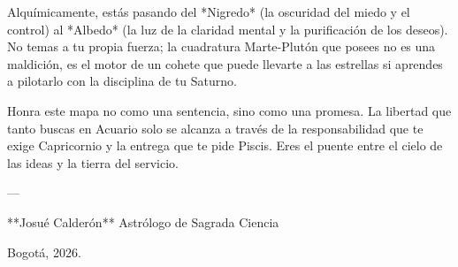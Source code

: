 Alquímicamente, estás pasando del *Nigredo* (la oscuridad del miedo y el control) al *Albedo* (la luz de la claridad mental y la purificación de los deseos). No temas a tu propia fuerza; la cuadratura Marte-Plutón que posees no es una maldición, es el motor de un cohete que puede llevarte a las estrellas si aprendes a pilotarlo con la disciplina de tu Saturno.

Honra este mapa no como una sentencia, sino como una promesa. La libertad que tanto buscas en Acuario solo se alcanza a través de la responsabilidad que te exige Capricornio y la entrega que te pide Piscis. Eres el puente entre el cielo de las ideas y la tierra del servicio.

---

**Josué Calderón** Astrólogo de Sagrada Ciencia

Bogotá, 2026.